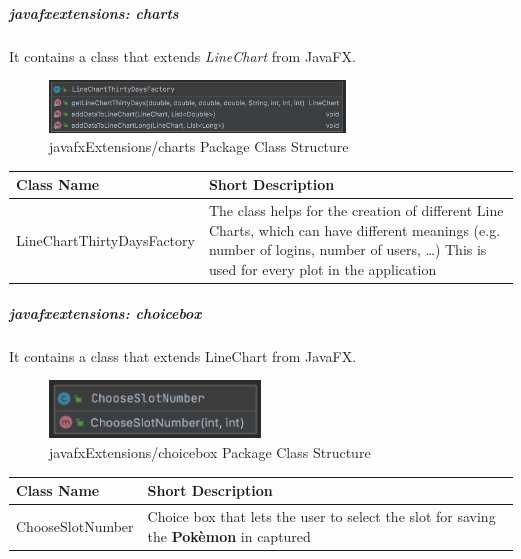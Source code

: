 \subparagraph{javafxextensions: charts}
It contains a class that extends \textit{LineChart} from JavaFX.
\begin{figure}[H]
	\centering
	\includegraphics[width=0.7\textwidth]{img/javafx_charts_package.png}
	\caption{javafxExtensions/charts Package Class Structure}
\end{figure}
\begingroup
\setlength{\tabcolsep}{10pt} %
\renewcommand{\arraystretch}{1.5} %
\begin{center}
	\begin{longtable}{| m{14em} | m{19em} |} 
		\hline
		\textbf{Class Name} & \textbf{Short Description} \\ [0.5ex] 
		\hline
		LineChartThirtyDaysFactory & The class helps for the creation of different Line Charts, which can have different meanings (e.g. number of logins, number of users, …)  This is used for every plot in the application\\ 
		\hline
	\end{longtable}
\end{center}
\endgroup

\subparagraph{javafxextensions: choicebox}
It contains a class that extends LineChart from JavaFX.
\begin{figure}[H]
	\centering
	\includegraphics[width=0.5\textwidth]{img/javafx_choicebox_package.png}
	\caption{javafxExtensions/choicebox Package Class Structure}
\end{figure}

\begingroup
\setlength{\tabcolsep}{10pt} %
\renewcommand{\arraystretch}{1.5} %
\begin{center}
	\begin{longtable}{| m{14em} | m{19em} |} 
		\hline
		\textbf{Class Name} & \textbf{Short Description} \\ [0.5ex] 
		\hline
		ChooseSlotNumber & Choice box that lets the user to select the slot for saving the \textbf{Pokèmon} in captured\\ 
		\hline
	\end{longtable}
\end{center}
\endgroup

